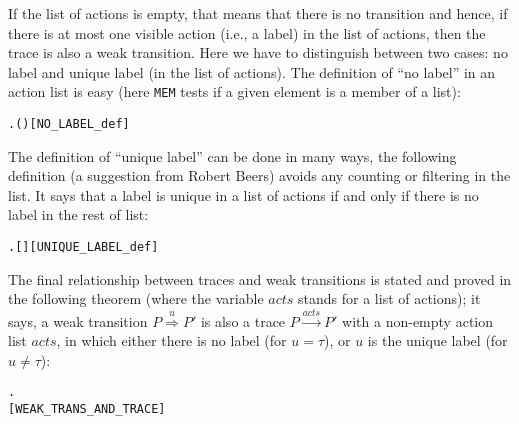 If the list of actions is empty, that means that there is no transition and hence,
if there is at most one visible action (i.e., a label) in the list of actions,
then the trace is also a weak transition. Here
we have to distinguish between two cases: no label and unique label (in
the list of actions). The definition of ``no
label'' in an action list is easy (here \texttt{MEM} tests if a given element is a member of a list):
\begin{alltt}
  \HOLSymConst{\HOLTokenDefEquality{}} \HOLSymConst{\HOLTokenNeg{}}\HOLSymConst{\HOLTokenExists{}}.  ( ) \hfill{[NO_LABEL_def]}
\end{alltt}

The definition of ``unique label'' can be done in many ways, the
following definition (a suggestion from Robert Beers)
avoids any counting or filtering in the list.
It says that a label is unique in a list of actions if and only if there is no
label in the rest of list:
\begin{alltt}
   \HOLSymConst{\HOLTokenDefEquality{}}
  \HOLSymConst{\HOLTokenExists{}} .  \HOLSymConst{\HOLTokenDoublePlus} [] \HOLSymConst{\HOLTokenDoublePlus}  \HOLSymConst{=}  \HOLSymConst{\HOLTokenConj{}}   \HOLSymConst{\HOLTokenConj{}}  \hfill{[UNIQUE_LABEL_def]}
\end{alltt}

The final relationship between traces and weak transitions is stated
and proved in the following theorem
(where the  variable $acts$ stands for
a list of actions); 
it says, a weak transition $P\overset{u}{\Rightarrow}P'$ is also a
trace $P\overset{acts}{\longrightarrow}P'$ with a
 non-empty action list $acts$, in which either there is no label (for $u = \tau$), or 
$u$ is the unique label (for $u \neq \tau$):
\begin{alltt}
\HOLTokenTurnstile{}  \HOLTokenWeakTransBegin{}\HOLTokenWeakTransEnd {} \HOLSymConst{\HOLTokenEquiv{}}
   \HOLSymConst{\HOLTokenExists{}}.
           \HOLSymConst{\HOLTokenConj{}} \HOLSymConst{\HOLTokenNeg{}}  \HOLSymConst{\HOLTokenConj{}}
         \HOLSymConst{=} \HOLSymConst{\ensuremath{\tau}}       \hfill{[WEAK_TRANS_AND_TRACE]}
\end{alltt}

